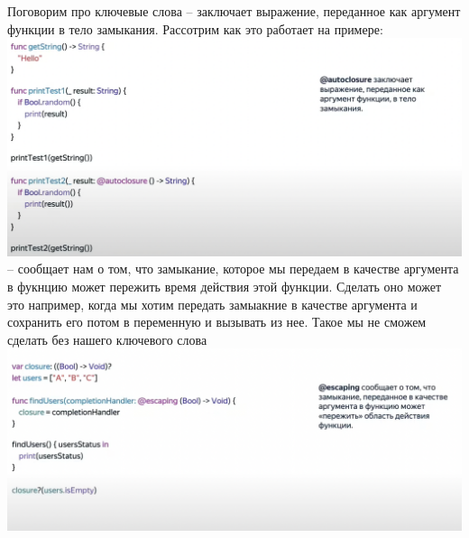 \documentclass{article}
\begin{document}
    \newline
    Поговорим про ключевые слова
    \newline
     -- заключает выражение, переданное как аргумент функции в тело замыкания. Рассотрим как это работает на примере: 
    \newline
    \includegraphics[scale = 0.5]{pic/Снимок экрана 2023-07-27 в 23.41.08.png}
    \newline
     -- сообщает нам о том, что замыкание, которое мы передаем в качестве аргумента в фукнцию может пережить время действия этой функции. Сделать оно может это например, когда мы хотим передать замыакние в качестве аргумента и сохранить его потом в переменную и вызывать из нее. Такое мы не сможем сделать без нашего ключевого слова
    \newline
    \includegraphics[scale = 0.5]{pic/Снимок экрана 2023-07-27 в 23.44.45.png}
    \newline
\end{document}
